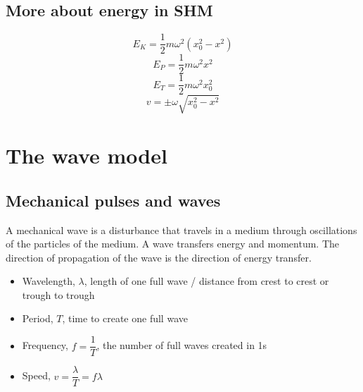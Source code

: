 \subsection{More about energy in SHM}
\[E_K=\dfrac{1}{2}m\omega^2(x_0^2-x^2)\]
\[E_P=\dfrac{1}{2}m\omega^2x^2\]
\[E_T=\dfrac{1}{2}m\omega^2x_0^2\]
\[v=\pm \omega\sqrt{x_0^2-x^2}\]
\section{The wave model}
\subsection{Mechanical pulses and waves}
A mechanical wave is a disturbance that travels in a medium through oscillations of the particles of the medium. A wave transfers energy and momentum. The direction of propagation of the wave is the direction of energy transfer.
\begin{itemize}
  \item Wavelength, $\lambda$, length of one full wave / distance from crest to crest or trough to trough
  \item Period, $T$, time to create one full wave
  \item Frequency, $f=\dfrac{1}{T}$, the number of full waves created in 1s
  \item Speed, $v=\dfrac{\lambda}{T}=f\lambda$
\end{itemize}
